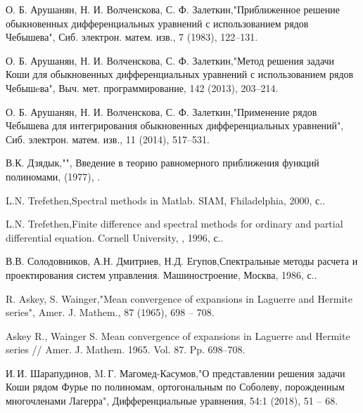 \begin{thebibliography}{20}
О. Б. Арушанян, Н. И. Волченскова, С. Ф. Залеткин,"Приближенное решение обыкновенных дифференциальных уравнений с использованием рядов Чебышева", Сиб. электрон. матем. изв., 7 (1983), 122–131.



О. Б. Арушанян, Н. И. Волченскова, С. Ф. Залеткин,"Метод решения задачи Коши для обыкновенных дифференциальных уравнений с использованием рядов Чебышeва", Выч. мет. программирование, 142 (2013), 203--214.



О. Б. Арушанян, Н. И. Волченскова, С. Ф. Залеткин,"Применение рядов Чебышева для интегрирования обыкновенных дифференциальных уравнений", Сиб. электрон. матем. изв., 11 (2014), 517--531.



В.К. Дзядык,"", Введение в теорию равномерного приближения функций полиномами,  (1977), .



L.N. Trefethen,Spectral methods in Matlab. SIAM, Fhiladelphia, 2000,  с..



L.N. Trefethen,Finite difference and spectral methods for ordinary and partial differential equation. Cornell University, , 1996,  с..



В.В. Солодовников, А.Н. Дмитриев, Н.Д. Егупов,Спектральные методы расчета и проектирования систем управления. Машиностроение, Москва, 1986,  с..



R. Askey, S. Wainger,"Mean convergence of expansions in Laguerre and Hermite series", Amer. J. Mathem., 87 (1965), 698 -- 708.



{Askey R., Wainger S.}
Mean convergence of expansions in Laguerre and Hermite series // Amer. J. Mathem. 1965. Vol. 87. Pp. 698--708.




И.\,И. Шарапудинов, M.\,Г. Магомед-Касумов,"О представлении решения задачи Коши  рядом Фурье  по полиномам, ортогональным по  Соболеву, порожденным многочленами Лагерра", Дифференциальные уравнения, 54:1 (2018), 51 -- 68.




\end{thebibliography}

